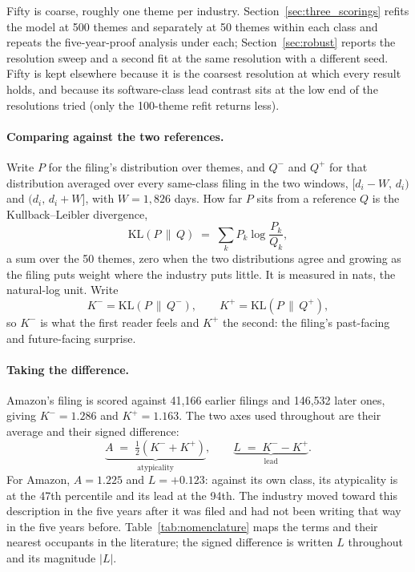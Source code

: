Fifty is coarse, roughly one theme per industry.
Section~\ref{sec:three_scorings} refits the model at 500 themes and
separately at 50 themes within each class and repeats the five-year-proof
analysis under each; Section~\ref{sec:robust} reports the resolution sweep
and a second fit at the same resolution with a different seed. Fifty is
kept elsewhere because it is the coarsest resolution at which every result
holds, and because its software-class lead contrast sits at the low end of
the resolutions tried (only the 100-theme refit returns less).

\paragraph{Comparing against the two references.} Write $P$ for the filing's
distribution over themes, and $Q^{-}$ and $Q^{+}$
for that distribution averaged over every same-class filing in the two
windows, $[d_i - W,\, d_i)$ and $(d_i,\, d_i + W]$, with $W = 1{,}826$ days.
How far $P$ sits from a reference $Q$ is the Kullback--Leibler divergence,
\[
  \mathrm{KL}(P \,\|\, Q) \;=\; \sum_{k} P_k \log \frac{P_k}{Q_k},
\]
a sum over the 50 themes, zero when the two distributions agree and growing as
the filing puts weight where the industry puts little. It is measured in nats,
the natural-log unit. Write
\[
  K^{-} = \mathrm{KL}(P \,\|\, Q^{-}),
  \qquad
  K^{+} = \mathrm{KL}(P \,\|\, Q^{+}),
\]
so $K^{-}$ is what the first reader feels and $K^{+}$ the second: the
filing's past-facing and future-facing surprise.

\paragraph{Taking the difference.} Amazon's filing is scored against 41{,}166
earlier filings and 146{,}532 later ones, giving $K^{-} = 1.286$ and
$K^{+} = 1.163$. The two axes used throughout are their average and their
signed difference:
\[
  \underbrace{A \;=\; \tfrac{1}{2}\left(K^{-} + K^{+}\right)}_{\text{atypicality}},
  \qquad
  \underbrace{L \;=\; K^{-} - K^{+}}_{\text{lead}} .
\]
For Amazon, $A = 1.225$ and $L = +0.123$: against its own class, its
atypicality is at the 47th percentile and its lead at the 94th. The
industry moved toward this description in the five years after it was filed
and had not been writing that way in the five years before.
Table~\ref{tab:nomenclature} maps the terms and their nearest occupants
in the literature; the signed difference is written $L$ throughout and
its magnitude $|L|$.

